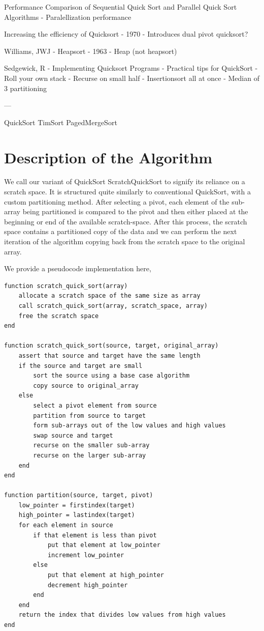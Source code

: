 \documentclass{juliacon}
\begin{document}
Performance Comparison of Sequential Quick Sort and
Parallel Quick Sort Algorithms
  - Paralellization performance

Increasing the efficiency of Quicksort
  - 1970
  - Introduces dual pivot quicksort?

Williams, JWJ - Heapsort
  - 1963
  - Heap (not heapsort)

Sedgewick, R - Implementing Quicksort Programs
  - Practical tips for QuickSort
    - Roll your own stack
    - Recurse on small half
    - Insertionsort all at once
    - Median of 3 partitioning

---

QuickSort
TimSort
PagedMergeSort

\section{Description of the Algorithm}

We call our variant of QuickSort ScratchQuickSort to signify its reliance on a scratch space. It is structured quite similarly to conventional QuickSort, with a custom partitioning method. After selecting a pivot, each element of the sub-array being partitioned is compared to the pivot and then either placed at the beginning or end of the available scratch-space. After this process, the scratch space contains a partitioned copy of the data and we can perform the next iteration of the algorithm copying back from the scratch space to the original array.

We provide a pseudocode implementation here,

\begin{lstlisting}
function scratch_quick_sort(array)
    allocate a scratch space of the same size as array
    call scratch_quick_sort(array, scratch_space, array)
    free the scratch space
end

function scratch_quick_sort(source, target, original_array)
    assert that source and target have the same length
    if the source and target are small
        sort the source using a base case algorithm
        copy source to original_array
    else
        select a pivot element from source
        partition from source to target
        form sub-arrays out of the low values and high values
        swap source and target
        recurse on the smaller sub-array
        recurse on the larger sub-array
    end
end

function partition(source, target, pivot)
    low_pointer = firstindex(target)
    high_pointer = lastindex(target)
    for each element in source
        if that element is less than pivot
            put that element at low_pointer
            increment low_pointer
        else
            put that element at high_pointer
            decrement high_pointer
        end
    end
    return the index that divides low values from high values
end
\end{lstlisting}
\end{document}
